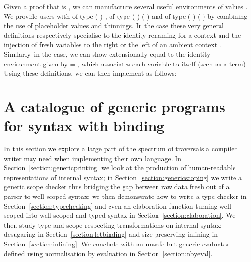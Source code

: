 \begin{agdasnippet}
\end{agdasnippet}

\label{sec:varlike:base}
Given a proof that  is , we can manufacture
  several useful environments of values . We provide users with
   of type {( )  },
   of type {( )  ( \AF{++} )}
  and  of type {( )  ( \AF{++} )}
  by combining the use of placeholder values and thinnings.
  In the  case these very general definitions respectively specialise
  to the identity renaming for a context  and the injection of 
  fresh variables to the right or the left of an ambient context .
  Similarly, in the  case, we can show  
  extensionally equal to the identity environment 
  given by {  = },
  which associates each variable to itself (seen as a term).
Using these definitions, we can then implement  as follows:

\begin{agdasnippet}
\end{agdasnippet}



\section{A catalogue of generic programs for syntax with binding}
\label{section:catalogue}

In this section we explore a large part of the spectrum of traversals a
compiler writer may need when implementing their own language.
In Section~\ref{section:genericprinting} we look at the production of
human-readable representations of internal syntax; in Section~\ref{section:genericscoping}
we write a generic scope checker thus bridging the gap between raw data
fresh out of a parser to well scoped syntax; we then demonstrate how to
write a type checker in Section~\ref{section:typechecking} and even an
elaboration function turning well scoped into well scoped and typed syntax
in Section~\ref{section:elaboration}. We then study type and scope respecting
transformations on internal syntax: desugaring in Section~\ref{section:letbinding}
and size preserving inlining in Section~\ref{section:inlining}. We conclude
with an unsafe but generic evaluator defined using normalisation by evaluation
in Section~\ref{section:nbyeval}.


